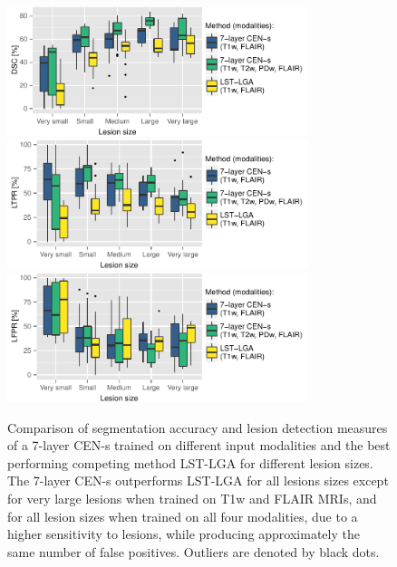 \begin{figure}
\centering
\includegraphics[width=0.78\textwidth]{figures/tmi/dsc}
\\[1em]
\includegraphics[width=0.78\textwidth]{figures/tmi/tpr}
\\[1em]
\includegraphics[width=0.78\textwidth]{figures/tmi/fpr}

\caption[Comparison of segmentation accuracy and lesion detection measures of a
7-layer CEN-s trained on different input modalities and the best performing
competing method LST-LGA for different lesion sizes]{Comparison of segmentation accuracy and lesion detection measures of
a 7-layer CEN-s trained on different input modalities and the best performing
competing method LST-LGA for different lesion sizes. The 7-layer CEN-s
outperforms LST-LGA for all lesions sizes except for very large lesions when
trained on T1w and FLAIR MRIs, and for all lesion sizes when trained on all four
modalities, due to a higher sensitivity to lesions, while producing
approximately the same number of false positives. Outliers are denoted by black
dots.}

\label{fig:sizecomp}
\end{figure}

